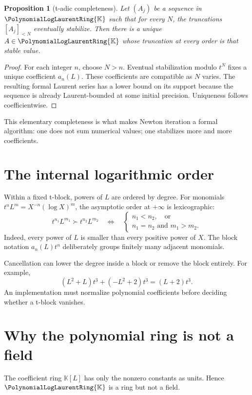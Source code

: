 \documentclass[11pt,openany]{book}
\theoremstyle{definition}
\theoremstyle{plain}
\newtheorem{proposition}{Proposition}[chapter]
\theoremstyle{remark}
\newcommand{\K}{\mathbb{K}}
\begin{document}
\begin{proposition}[t-adic completeness]\label{prop:qcomplete}
Let \((A_j)\) be a sequence in \(\PolynomialLogLaurentRing{\K}\) such that for every \(N\), the
truncations \([A_j]_{<N}\) eventually stabilize.  Then there is a unique
\(A\in\PolynomialLogLaurentRing{\K}\) whose truncation at every order is that stable value.
\end{proposition}
\begin{proof}
For each integer \(n\), choose \(N>n\).  Eventual stabilization modulo \(t^N\)
fixes a unique coefficient \(a_n(L)\).  These coefficients are compatible as
\(N\) varies.  The resulting formal Laurent series has a lower bound on its
support because the sequence is already Laurent-bounded at some initial
precision.  Uniqueness follows coefficientwise.
\end{proof}
This elementary completeness is what makes Newton iteration a formal algorithm:
one does not sum numerical values; one stabilizes more and more coefficients.

\section{The internal logarithmic order}
Within a fixed t-block, powers of \(L\) are ordered by degree.  For monomials
\(t^nL^m=X^{-n}(\log X)^m\), the asymptotic order at \(+\infty\) is
lexicographic:
\begin{equation}\label{eq:lex-order}
 t^{n_1}L^{m_1}\succ t^{n_2}L^{m_2}
 \quad\Longleftrightarrow\quad
 \begin{cases}
 n_1<n_2,\quad\text{or}\\
 n_1=n_2\text{ and }m_1>m_2.
 \end{cases}
\end{equation}
Indeed, every power of \(L\) is smaller than every positive power of \(X\).
The block notation \(a_n(L)t^n\) deliberately groups finitely many adjacent
monomials.

Cancellation can lower the degree inside a block or remove the block entirely.
For example,
\[
 (L^2+L)t^3+(-L^2+2)t^3=(L+2)t^3.
\]
An implementation must normalize polynomial coefficients before deciding
whether a t-block vanishes.

\section{Why the polynomial ring is not a field}
The coefficient ring \(\K[L]\) has only the nonzero constants as units.  Hence
\(\PolynomialLogLaurentRing{\K}\) is a ring but not a field.
\end{document}
